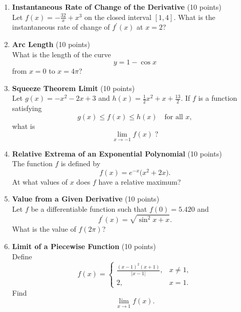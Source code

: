 \begin{enumerate}
  \item \textbf{Instantaneous Rate of Change of the Derivative} (10 points)\\
  Let $f(x)=-\frac{32}{x}+x^3$ on the closed interval $[1,4]$. What is the instantaneous rate of change of $f^{\prime}(x)$ at $x=2$?
  \begin{subanswer}
  \end{subanswer}

  \item \textbf{Arc Length} (10 points)\\
  What is the length of the curve
  \[
    y = 1 - \cos x
  \]
  from $x=0$ to $x=4\pi$?
  \begin{subanswer}
  \end{subanswer}

  \item \textbf{Squeeze Theorem Limit} (10 points)\\
  Let $g(x)=-x^2-2x+3$ and $h(x)=\tfrac{1}{2}x^2 + x + \tfrac{13}{2}$. If $f$ is a function satisfying
  \[
    g(x) \le f(x) \le h(x)
    \quad\text{for all }x,
  \]
  what is
  \[
    \lim_{x\to -1} f(x)\;?
  \]
  \begin{subanswer}
  \end{subanswer}

  \item \textbf{Relative Extrema of an Exponential Polynomial} (10 points)\\
  The function $f$ is defined by
  \[
    f(x)=e^{-x}\bigl(x^2+2x\bigr).
  \]
  At what values of $x$ does $f$ have a relative maximum?
  \begin{subanswer}
  \end{subanswer}

  \item \textbf{Value from a Given Derivative} (10 points)\\
  Let $f$ be a differentiable function such that $f(0)=5.420$ and
  \[
    f^{\prime}(x)=\sqrt{\sin^2 x + x}.
  \]
  What is the value of $f(2\pi)$?
  \begin{subanswer}
  \end{subanswer}

  \item \textbf{Limit of a Piecewise Function} (10 points)\\
  Define
  \[
    f(x) =
    \begin{cases}
      \displaystyle \frac{(x-1)^2 (x+1)}{|x-1|}, & x \neq 1,\\[8pt]
      2, & x=1.
    \end{cases}
  \]
  Find
  \[
    \lim_{x\to 1} f(x).
  \]
  \begin{subanswer}
  \end{subanswer}






  

\end{enumerate}
